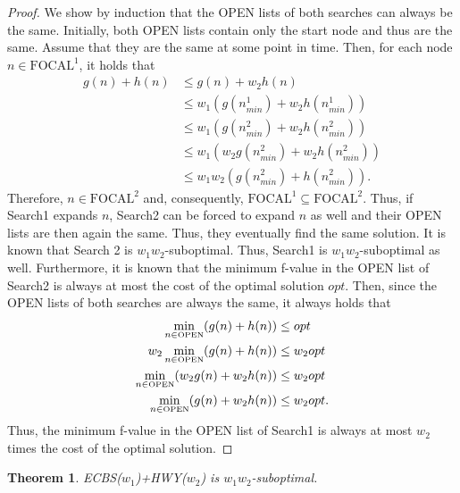 \documentclass[letterpaper]{article}
\newtheorem{theorem}{Theorem}
\theoremstyle{definition}
\newcommand{\open}{\mbox{OPEN}\xspace}
\newcommand{\focaln}[1]{\ensuremath{\mbox{FOCAL}^{#1}}}
\begin{document}
\begin{proof}
We show by induction that the \open lists of both searches can always be the
same. Initially, both \open lists contain only the start node and thus are the
same. Assume that they are the same at some point in time. Then, for each node
$n \in \focaln1$, it holds that
{\small
\begin{align*}
  g(n)+h(n) & \leq g(n) + w_2 h(n) \\
  & \leq w_1 ( g(n^1_{min}) + w_2 h(n^1_{min}) ) \\
  & \leq w_1 ( g(n^2_{min}) + w_2 h(n^2_{min}) ) \\
  & \leq w_1 ( w_2 g(n^2_{min}) + w_2 h(n^2_{min}) ) \\
  & \leq w_1 w_2 ( g(n^2_{min}) + h(n^2_{min})).
\end{align*}
}Therefore, $n \in \focaln2$ and, consequently, $\focaln1 \subseteq
\focaln2$. Thus, if Search1 expands $n$, Search2 can be forced to expand $n$
as well and their \open lists are then again the same. Thus, they eventually
find the same solution. It is known that Search 2 is $w_1 w_2$-suboptimal.
Thus, Search1 is $w_1 w_2$-suboptimal as well. Furthermore, it is known that
the minimum f-value in the \open list of Search2 is always at most the cost of
the optimal solution $opt$. Then, since the \open lists of both searches are
always the same, it always holds that {\small
\begin{align*}
\min_{n \in \tiny \open} (g(n) + h(n)) & \leq opt \\
w_2 \min_{n \in \tiny \open} (g(n) + h(n)) & \leq w_2 opt \\
\min_{n \in \tiny \open} (w_2 g(n) + w_2 h(n)) & \leq w_2 opt \\
\min_{n \in \tiny \open} (g(n) + w_2 h(n)) & \leq w_2 opt.
\end{align*}
}
Thus, the minimum f-value in the \open list of Search1 is always at most
$w_2$ times the cost of the optimal solution.
\end{proof}

\begin{theorem}
  ECBS($w_1$)+HWY($w_2$) is $w_1 w_2$-suboptimal.
\end{theorem}
\end{document}
